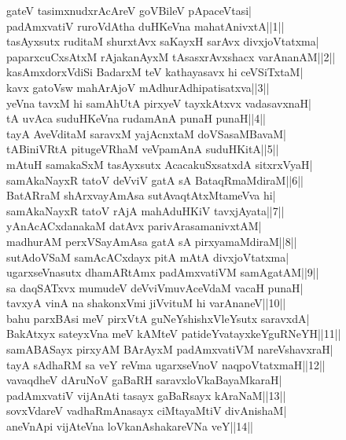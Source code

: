 \documentclass{article}
\begin{document}
gateV tasimxnudxrAcAreV goVBileV pApaceVtasi|\\
padAmxvatiV ruroVdAtha duHKeVna mahatAnivxtA||1||\\
tasAyxsutx ruditaM shurxtAvx saKayxH sarAvx divxjoVtatxma|\\
paparxcuCxsAtxM rAjakanAyxM tAsasxrAvxshacx varAnanAM||2||\\
kasAmxdorxVdiSi BadarxM teV kathayasavx hi ceVSiTxtaM|\\
kavx gatoVsw mahArAjoV mAdhurAdhipatisatxva||3||\\
yeVna tavxM hi samAhUtA pirxyeV tayxkAtxvx vadasavxnaH|\\
tA uvAca suduHKeVna rudamAnA punaH punaH||4||\\
tayA AveVditaM saravxM yajAcnxtaM doVSasaMBavaM|\\
tABiniVRtA pitugeVRhaM veVpamAnA suduHKitA||5||\\
mAtuH samakaSxM tasAyxsutx AcacakuSxsatxdA sitxrxVyaH|\\
samAkaNayxR tatoV deVviV gatA sA BataqRmaMdiraM||6||\\
BatARraM shArxvayAmAsa sutAvaqtAtxMtameVva hi|\\
samAkaNayxR tatoV rAjA mahAduHKiV tavxjAyata||7||\\
yAnAcACxdanakaM datAvx parivArasamanivxtAM|\\
madhurAM perxVSayAmAsa gatA sA pirxyamaMdiraM||8||\\
sutAdoVSaM samAcACxdayx pitA mAtA divxjoVtatxma|\\
ugarxseVnasutx dhamARtAmx padAmxvatiVM samAgatAM||9||\\
sa daqSATxvx mumudeV deVviVmuvAceVdaM vacaH punaH|\\
tavxyA vinA na shakonxVmi jiVvituM hi varAnaneV||10||\\
bahu parxBAsi meV pirxVtA guNeYshishxVleYsutx saravxdA|\\
BakAtxyx sateyxVna meV kAMteV patideYvatayxkeYguRNeYH||11||\\
samABASayx pirxyAM BArAyxM padAmxvatiVM nareVshavxraH|\\
tayA sAdhaRM sa veY reVma ugarxseVnoV naqpoVtatxmaH||12||\\
vavaqdheV dAruNoV gaBaRH saravxloVkaBayaMkaraH|\\
padAmxvatiV vijAnAti tasayx gaBaRsayx kAraNaM||13||\\
sovxVdareV vadhaRmAnasayx ciMtayaMtiV divAnishaM|\\
aneVnApi vijAteVna loVkanAshakareVNa veY||14||\\
\end{document}
